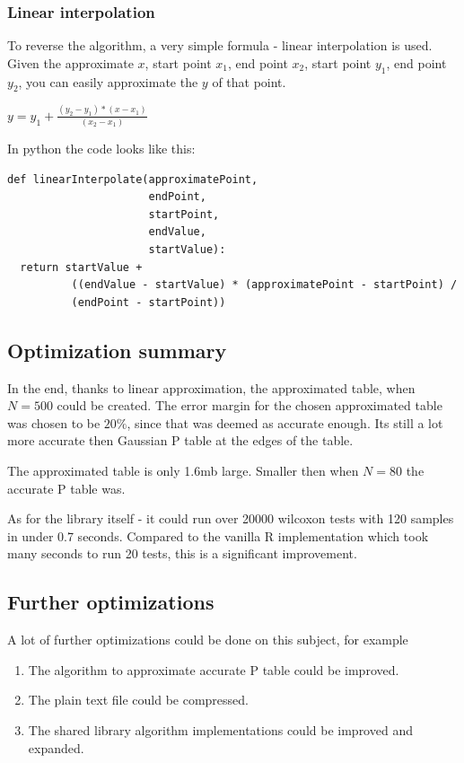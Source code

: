 \documentclass[12pt]{article}
\begin{document}
\subsubsection{Linear interpolation}
To reverse the algorithm, a very simple formula - linear interpolation is used. Given the approximate $x$, start point $x_1$, end point $x_2$, start point $y_1$, end point $y_2$, you can easily approximate the $y$ of that point.

$y = y_1 + \frac{(y_2 - y_1) * (x - x_1)}{(x_2 - x_1)}$

In python the code looks like this:

\begin{verbatim}
def linearInterpolate(approximatePoint,
                      endPoint,
                      startPoint,
                      endValue,
                      startValue):
  return startValue +
          ((endValue - startValue) * (approximatePoint - startPoint) /
          (endPoint - startPoint))
\end{verbatim}

\subsection{Optimization summary}
In the end, thanks to linear approximation, the approximated table, when $N=500$ could be created. The error margin for the chosen approximated table was chosen to be $20\%$, since that was deemed as accurate enough. Its still a lot more accurate then Gaussian P table at the edges of the table.

The approximated table is only 1.6mb large. Smaller then when $N=80$ the accurate P table was.

As for the library itself - it could run over 20000 wilcoxon tests with 120 samples in under 0.7 seconds. Compared to the vanilla R implementation which took many seconds to run 20 tests, this is a significant improvement.

\subsection{Further optimizations}
A lot of further optimizations could be done on this subject, for example

\begin{enumerate}
\item The algorithm to approximate accurate P table could be improved.
\item The plain text file could be compressed.
\item The shared library algorithm implementations could be improved and expanded.
\end{enumerate}
\end{document}
